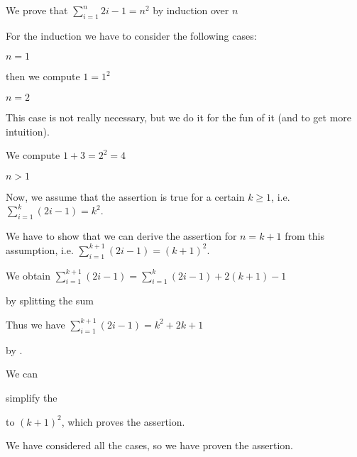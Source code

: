 \documentclass{article}
\begin{document}
\begin{sproof}[id=simple-proof,for=sum-over-odds]
	{We prove that $\sum_{i=1}^n{2i-1}=n^{2}$ by induction over $n$}
	\begin{spfcases}{For the induction we have to consider the following cases:}
		\begin{spfcase}{$n=1$}
		    \begin{spfstep}[display=flow] then we compute $1=1^2$\end{spfstep}
		\end{spfcase}
		\begin{spfcase}{$n=2$}
			\begin{sproofcomment}[display=flow]
		        This case is not really necessary, but we do it for the fun of it (and to get more intuition).
			\end{sproofcomment}
			\begin{spfstep}[display=flow]
				We compute $1+3=2^{2}=4$
			\end{spfstep}
		\end{spfcase}
		\begin{spfcase}{$n>1$}
			\begin{spfstep}[type=hypothesis,id=ind-hyp]
				Now, we assume that the assertion is true for a certain $k\geq 1$, i.e. $\sum_{i=1}^k{(2i-1)}=k^{2}$.
			\end{spfstep}
			\begin{sproofcomment}
				We have to show that we can derive the assertion for $n=k+1$ from this assumption, i.e.  $\sum_{i=1}^{k+1}{(2i-1)}=(k+1)^{2}$.
			\end{sproofcomment}
			\begin{spfstep}[id=splitit]
				We obtain $\sum_{i=1}^{k+1}{(2i-1)}=\sum_{i=1}^k{(2i-1)}+2(k+1)-1$
				\begin{justification}[method=arith:split-sum]
					by splitting the sum
			    \end{justification}
			\end{spfstep}
			\begin{spfstep}[id=byindhyp]
				Thus we have $\sum_{i=1}^{k+1}{(2i-1)}=k^2+2k+1$
				\begin{justification}[method=fertilize]
					by .
				\end{justification}
			\end{spfstep}
			\begin{spfstep}[type=conclusion]
				We can \begin{justification}[method=simplify-eq]
				simplify the {}
				\end{justification} to $(k+1)^2$, which proves the assertion.
			\end{spfstep}
		\end{spfcase}
		\begin{spfstep}[type=conclusion]
			We have considered all the cases, so we have proven the assertion.
		\end{spfstep}
	\end{spfcases}
\end{sproof}
\end{document}
